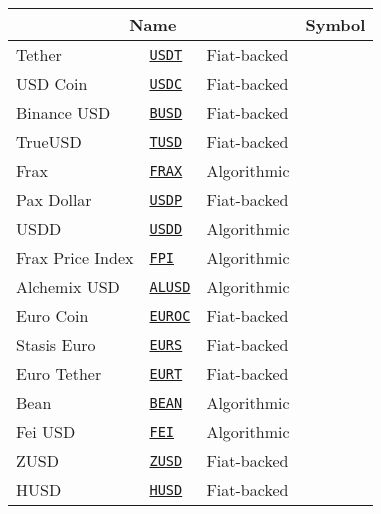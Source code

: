 \begin{tabular}{lllll}
\toprule
\multicolumn{3}{|c|}{Name} & \multicolumn{3}{|c|}{Symbol} & Type \\
\midrule
Tether & \href{https://etherscan.io/address/0xdAC17F958D2ee523a2206206994597C13D831ec7}{\tt USDT} & Fiat-backed \\
USD Coin & \href{https://etherscan.io/address/0xA0b86991c6218b36c1d19D4a2e9Eb0cE3606eB48}{\tt USDC} & Fiat-backed \\
Binance USD & \href{https://etherscan.io/address/0x4Fabb145d64652a948d72533023f6E7A623C7C53}{\tt BUSD} & Fiat-backed \\
TrueUSD & \href{https://etherscan.io/address/0x0000000000085d4780B73119b644AE5ecd22b376}{\tt TUSD} & Fiat-backed \\
Frax & \href{https://etherscan.io/address/0x853d955aCEf822Db058eb8505911ED77F175b99e}{\tt FRAX} & Algorithmic \\
Pax Dollar & \href{https://etherscan.io/address/0x8E870D67F660D95d5be530380D0eC0bd388289E1}{\tt USDP} & Fiat-backed \\
USDD & \href{https://etherscan.io/address/0x0C10bF8FcB7Bf5412187A595ab97a3609160b5c6}{\tt USDD} & Algorithmic \\
Frax Price Index & \href{https://etherscan.io/address/0x5Ca135cB8527d76e932f34B5145575F9d8cbE08E}{\tt FPI} & Algorithmic \\
Alchemix USD & \href{https://etherscan.io/address/0xBC6DA0FE9aD5f3b0d58160288917AA56653660E9}{\tt ALUSD} & Algorithmic \\
Euro Coin & \href{https://etherscan.io/address/0x1aBaEA1f7C830bD89Acc67eC4af516284b1bC33c}{\tt EUROC} & Fiat-backed \\
Stasis Euro & \href{https://etherscan.io/address/0xdB25f211AB05b1c97D595516F45794528a807ad8}{\tt EURS} & Fiat-backed \\
Euro Tether & \href{https://etherscan.io/address/0xC581b735A1688071A1746c968e0798D642EDE491}{\tt EURT} & Fiat-backed \\
Bean & \href{https://etherscan.io/address/0xBEA0000029AD1c77D3d5D23Ba2D8893dB9d1Efab}{\tt BEAN} & Algorithmic \\
Fei USD & \href{https://etherscan.io/address/0x956F47F50A910163D8BF957Cf5846D573E7f87CA}{\tt FEI} & Algorithmic \\
ZUSD & \href{https://etherscan.io/address/0xc56c2b7e71B54d38Aab6d52E94a04Cbfa8F604fA}{\tt ZUSD} & Fiat-backed \\
HUSD & \href{https://etherscan.io/address/0xdF574c24545E5FfEcb9a659c229253D4111d87e1}{\tt HUSD} & Fiat-backed \\

\end{tabular}
